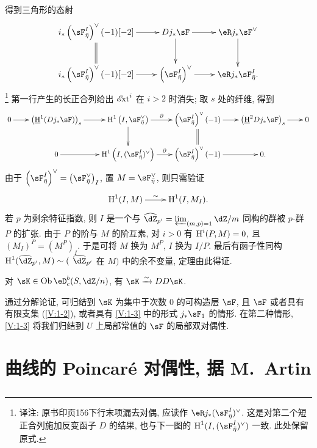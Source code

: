 得到三角形的态射
\[\xymatrix{
  i_\ast\left(\sF_{\bar\eta}^I\right)^\vee (-1)[-2] \ar[r] \ar@{=}[d]
    & D j_\ast\sF \ar[r] \ar[d]
    & \eR j_\ast \sF^\vee \ar[d] \\
  i_\ast\left(\sF_{\bar\eta}^I\right)^\vee(-1)[-2] \ar[r]
    & \left(\sF_{\bar\eta}^I\right)^\vee \ar[r]
    & \eR j_\ast \sF_{\bar\eta}^I \text{.}
}\]
\footnote{译注: 原书印页156下行末项漏去对偶, 应读作 $\eR j_\ast(\sF_{\bar\eta}^I)^\vee$. 这是对第二个短正合列施加反变函子 $D$ 的结果, 也与下一图的 $\h^1(I,(\sF_{\bar\eta}^I)^\vee)$ 一致. 此处保留原式.}
第一行产生的长正合列给出 $\operatorname{\mathscr{E}\!xt}^i$ 在 $i>2$ 时消失;
取 $s$ 处的纤维, 得到
\[\xymatrix@=0.7cm{
  0 \ar[r]
    & \left(\underline\h^1(D j_\ast\sF)\right)_s \ar[r]
    & \h^1\left(I,\sF_{\bar\eta}^\vee\right) \ar[r]^-\partial \ar[d]
    & \left(\sF_{\bar\eta}^I\right)^\vee(-1) \ar[r] \ar@{=}[d]
    & \left(\underline\h^2 D j_\ast\sF\right)_s \ar[r]
    & 0 \\
  & 0 \ar[r]
    & \h^1\left(I,(\sF_{\bar\eta}^I)^\vee\right) \ar[r]^-\partial
    & \left(\sF_{\bar\eta}^I\right)^\vee(-1) \ar[r]
    & 0 \text{.}
}\]
由于 $\left(\sF_{\bar\eta}^I\right)^\vee = \left(\sF_{\bar\eta}^\vee\right)_I$,
置 $M=\sF_{\bar\eta}^\vee$, 则只需验证
\[\xymatrix{
  \h^1(I,M) \ar[r]^-\sim
    & \h^1(I,M_I) \text{.}
}\]
若 $p$ 为剩余特征指数, 则 $I$ 是一个与
$\widehat\dZ_{p'} = \varprojlim_{(m,p)=1} \dZ/m$ 同构的群被 $p$-群 $P$ 的扩张.
由于 $P$ 的阶与 $M$ 的阶互素, 对 $i>0$ 有 $\operatorname{H}^i(P,M)=0$,
且 $(M_I)^P=(M^P)_I$. 于是可将 $M$ 换为 $M^P$, $I$ 换为 $I/P$.
最后有函子性同构
$\h^1(\widehat\dZ_{p'},M)\sim ($ $\widehat\dZ_{p'}$ 在 $M)$ 中的余不变量,
定理由此得证.

\begin{theorem_}\label{V:1-4}
对 $\sK\in \ob\eD_c^b(S,\dZ/n)$, 有 $\sK\iso D D \sK$.
\end{theorem_}

通过分解论证, 可归结到 $\sK$ 为集中于次数 $0$ 的可构造层 $\sF$,
且 $\sF$ 或者具有有限支集 (\ref{V:1-2}), 或者具有 \ref{V:1-3} 中的形式 $j_\ast\sF_1$ 的情形.
在第二种情形, \ref{V:1-3} 将我们归结到 $U$ 上局部常值的 $\sF$ 的局部双对偶性.

\section{曲线的 Poincaré 对偶性, 据 M.\ Artin}\label{V:2}

\subsection{}\label{V:2-1}

